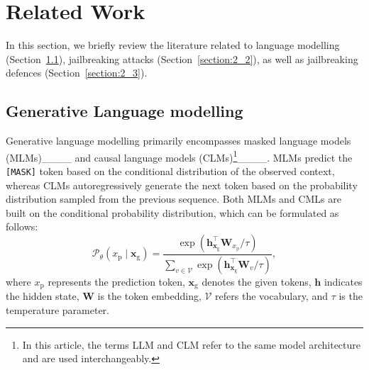 \section{Related Work}
In this section, we briefly review the literature related to language modelling (Section~\ref{section:2_1}), jailbreaking attacks (Section~\ref{section:2_2}), as well as jailbreaking defences (Section~\ref{section:2_3}).

\subsection{Generative Language modelling}
\label{section:2_1}

Generative language modelling primarily encompasses masked language models (MLMs)____ and causal language models (CLMs)\footnote{In this article, the terms LLM and CLM refer to the same model architecture and are used interchangeably.}____.
MLMs predict the \texttt{[MASK]} token based on the conditional distribution of the observed context, whereas CLMs autoregressively generate the next token based on the probability distribution sampled from the previous sequence.
Both MLMs and CMLs are built on the conditional probability distribution, which can be formulated as follows:
\vspace{-0.5em}
\begin{equation}
\label{equation:1}
\mathcal{P}_\theta\left(x_{\text{p}} \mid \mathbf{x}_{\text{g}}\right)=\frac{\exp \left(\mathbf{h}_{\mathbf{x}_{\text{g}}}^{\top} \mathbf{W}_{x_{\text{p}}} / \tau\right)}{\sum_{v \in \mathcal{V}} \exp \left(\mathbf{h}_{\mathbf{x}_{\text{g}}}^{\top} \mathbf{W}_v / \tau\right)},
\end{equation} 
where $x_{\text{p}}$ represents the prediction token, $\mathbf{x}_{\text{g}}$ denotes the given tokens, $\mathbf{h}$ indicates the hidden state, $\mathbf{W}$ is the token embedding, $\mathcal{V}$ refers the vocabulary, and $\tau$ is the temperature parameter.

